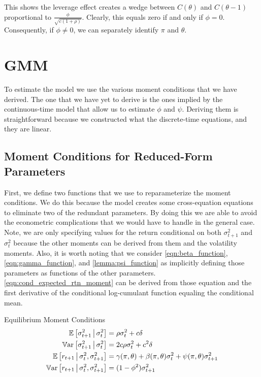 \documentclass[11pt, letterpaper, twoside, final]{article}
\begin{document}
This shows the leverage effect creates a wedge between $C(\theta)$ and $C(\theta-1)$ proportional to $\frac{\phi}{\sqrt{c (1 + \rho )}}$. Clearly, this equals zero if and only if $\phi = 0$. Consequently, if $\phi \neq 0$, we can separately identify $\pi$ and $\theta$.

\section{GMM}\label{sec:GMM}

To estimate the model we use the various moment conditions that we have derived. The one that we have yet to derive is the ones implied by the continuous-time model that allow us to estimate $\phi$ and $\psi$. Deriving them is straightforward because we constructed what the discrete-time equations, and they are linear.

\subsection{Moment Conditions for Reduced-Form Parameters}\label{sec:moment_conditions}

First, we define two functions that we use to reparameterize the moment conditions. We do this because the model creates some cross-equation equations to eliminate two of the redundant parameters. By doing this we are able to avoid the econometric complications that we would have to handle in the general case. Note, we are only specifying values for the return conditional on both $\sigma^2_{t+1}$ and $\sigma^2_t$ because the other moments can be derived from them and the volatility moments. Also, it is worth noting that we consider \cref{eqn:beta_function}, \cref{eqn:gamma_function}, and \cref{lemma:psi_function} as implicitly defining those parameters as functions of the other parameters. \cref{eqn:cond_expected_rtn_moment} can be derived from those equation and the first derivative of the conditional log-cumulant function equaling the conditional mean.


\begin{defn}{Equilibrium Moment Conditions}
  \label{defn:equilibrium_moment_conditions}
  \begin{align}
    \label{eqn:cond_vol_mean}
    \E\left[\sigma^2_{t+1} \mvert \sigma^2_t \right] &= \rho \sigma^2_t + c \delta\\
%
    \label{eqn:cond_vol_var}
    \Var\left[\sigma^2_{t+1} \mvert \sigma^2_t \right] &= 2 c \rho \sigma^2_t + c^2 \delta \\
%
    \label{eqn:cond_expected_rtn_moment}
    \E\left[r_{t+1} \mvert \sigma^2_t, \sigma^2_{t+1}\right] &= \gamma(\pi, \theta) + \beta(\pi, \theta)
    \sigma^2_t + \psi(\pi, \theta) \sigma^2_{t+1} \\
%
    \label{eqn:cond_rtn_var}
    \Var\left[r_{t+1} \mvert \sigma^2_t, \sigma^2_{t+1}\right] &= (1 - \phi^2) \sigma^2_{t+1} 
\end{align}
\end{defn}
\end{document}
